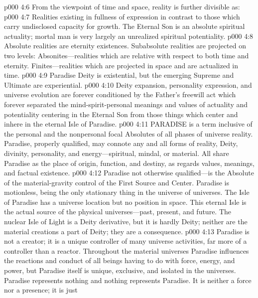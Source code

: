 \pc \vs p000 4:6 From the viewpoint of time and space, reality is further divisible as:
\pc \vs p000 4:7 \bibnobreakspace {} Realities existing in fullness of expression in contrast to those which carry undisclosed capacity for growth. The Eternal Son is an absolute spiritual actuality; mortal man is very largely an unrealized spiritual potentiality.
\vs p000 4:8 \bibnobreakspace {} Absolute realities are eternity existences. Subabsolute realities are projected on two levels: Absonites---realities which are relative with respect to both time and eternity. Finites---realities which are projected in space and are actualized in time.
\vs p000 4:9 \bibnobreakspace {} Paradise Deity is existential, but the emerging Supreme and Ultimate are experiential.
\vs p000 4:10 \bibnobreakspace {} Deity expansion, personality expression, and universe evolution are forever conditioned by the Father’s freewill act which forever separated the mind\hyp{}spirit\hyp{}personal meanings and values of actuality and potentiality centering in the Eternal Son from those things which center and inhere in the eternal Isle of Paradise.\plusone
\pc \vs p000 4:11 PARADISE is a term inclusive of the personal and the nonpersonal focal Absolutes of all phases of universe reality. Paradise, properly qualified, may connote any and all forms of reality, Deity, divinity, personality, and energy---spiritual, mindal, or material. All share Paradise as the place of origin, function, and destiny, as regards values, meanings, and factual existence.
\pc \vs p000 4:12 Paradise not otherwise qualified---is the Absolute of the material\hyp{}gravity control of the First Source and Center. Paradise is motionless, being the only stationary thing in the universe of universes. The Isle of Paradise has a universe location but no position in space. This eternal Isle is the actual source of the physical universes---past, present, and future. The nuclear Isle of Light is a Deity derivative, but it is hardly Deity; neither are the material creations a part of Deity; they are a consequence.
\vs p000 4:13 Paradise is not a creator; it is a unique controller of many universe activities, far more of a controller than a reactor. Throughout the material universes Paradise influences the reactions and conduct of all beings having to do with force, energy, and power, but Paradise itself is unique, exclusive, and isolated in the universes. Paradise represents nothing and nothing represents Paradise. It is neither a force nor a presence; it is just 

